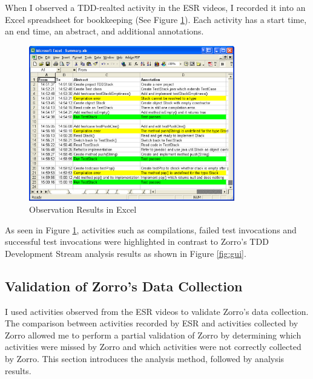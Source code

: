 When I observed a TDD-realted activity in the ESR videos, I recorded it into an Excel spreadsheet for bookkeeping (See Figure \ref{fig:VideoExcelScript}). Each activity has a start time, an end 
time, an abstract, and additional annotations.
\begin{figure}[htbp]
  \centering
  \includegraphics[width=0.8\textwidth]{figs/ESR-VideoScript}
  \caption{Observation Results in Excel}
  \label{fig:VideoExcelScript}
\end{figure}
As seen in Figure \ref{fig:VideoExcelScript}, activities such as compilations, failed test invocations and successful test invocations were highlighted in contrast to Zorro's TDD Development Stream analysis results as shown in Figure \ref{fig:gui}.

\subsection{Validation of Zorro's Data Collection}
\label{sec:Pilot-Validation-Collection}
I used activities observed from the ESR videos to validate Zorro's data collection. The comparison between activities recorded by ESR and activities collected by Zorro allowed me to perform a partial validation of Zorro by determining which activities were missed by Zorro and which activities were not correctly collected by Zorro. This section introduces the analysis method, followed by analysis results. 


